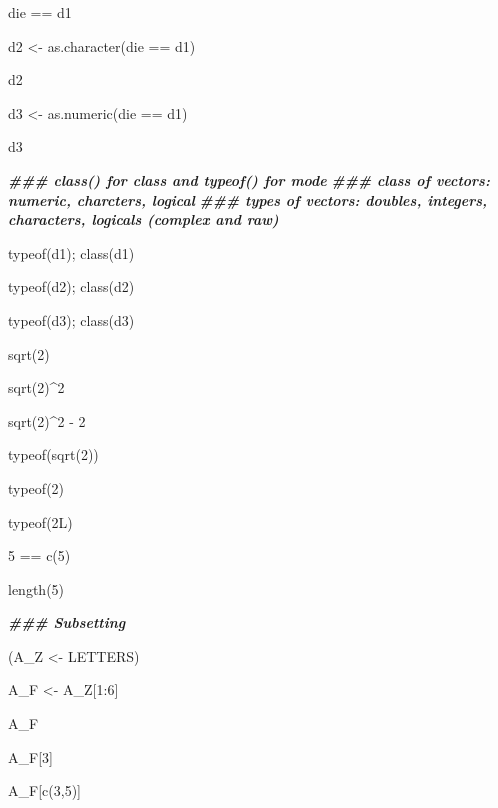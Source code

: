 \documentclass[
]{article}
\newenvironment{Shaded}{\begin{snugshade}}{\end{snugshade}}
\newcommand{\DecValTok}[1]{\textcolor[rgb]{0.00,0.00,0.81}{#1}}
\newcommand{\DocumentationTok}[1]{\textcolor[rgb]{0.56,0.35,0.01}{\textbf{\textit{#1}}}}
\newcommand{\FunctionTok}[1]{\textcolor[rgb]{0.00,0.00,0.00}{#1}}
\newcommand{\NormalTok}[1]{#1}
\newcommand{\OtherTok}[1]{\textcolor[rgb]{0.56,0.35,0.01}{#1}}
\newcommand{\SpecialCharTok}[1]{\textcolor[rgb]{0.00,0.00,0.00}{#1}}
\begin{document}
\begin{Shaded}
\begin{Highlighting}[]
\NormalTok{die }\SpecialCharTok{==}\NormalTok{ d1}

\NormalTok{d2 }\OtherTok{\textless{}{-}} \FunctionTok{as.character}\NormalTok{(die }\SpecialCharTok{==}\NormalTok{ d1)}

\NormalTok{d2}

\NormalTok{d3 }\OtherTok{\textless{}{-}} \FunctionTok{as.numeric}\NormalTok{(die }\SpecialCharTok{==}\NormalTok{ d1)}

\NormalTok{d3}

\DocumentationTok{\#\#\# class() for class and typeof() for mode}
\DocumentationTok{\#\#\# class of vectors: numeric, charcters, logical}
\DocumentationTok{\#\#\# types of vectors: doubles, integers, characters, logicals (complex and raw)}

\FunctionTok{typeof}\NormalTok{(d1); }\FunctionTok{class}\NormalTok{(d1)}

\FunctionTok{typeof}\NormalTok{(d2); }\FunctionTok{class}\NormalTok{(d2)}

\FunctionTok{typeof}\NormalTok{(d3); }\FunctionTok{class}\NormalTok{(d3)}

\FunctionTok{sqrt}\NormalTok{(}\DecValTok{2}\NormalTok{)}

\FunctionTok{sqrt}\NormalTok{(}\DecValTok{2}\NormalTok{)}\SpecialCharTok{\^{}}\DecValTok{2}

\FunctionTok{sqrt}\NormalTok{(}\DecValTok{2}\NormalTok{)}\SpecialCharTok{\^{}}\DecValTok{2} \SpecialCharTok{{-}} \DecValTok{2}

\FunctionTok{typeof}\NormalTok{(}\FunctionTok{sqrt}\NormalTok{(}\DecValTok{2}\NormalTok{))}

\FunctionTok{typeof}\NormalTok{(}\DecValTok{2}\NormalTok{)}

\FunctionTok{typeof}\NormalTok{(2L)}

\DecValTok{5} \SpecialCharTok{==} \FunctionTok{c}\NormalTok{(}\DecValTok{5}\NormalTok{)}

\FunctionTok{length}\NormalTok{(}\DecValTok{5}\NormalTok{)}

\DocumentationTok{\#\#\# Subsetting}

\NormalTok{(A\_Z }\OtherTok{\textless{}{-}}\NormalTok{ LETTERS)}

\NormalTok{A\_F }\OtherTok{\textless{}{-}}\NormalTok{ A\_Z[}\DecValTok{1}\SpecialCharTok{:}\DecValTok{6}\NormalTok{]}

\NormalTok{A\_F}

\NormalTok{A\_F[}\DecValTok{3}\NormalTok{]}

\NormalTok{A\_F[}\FunctionTok{c}\NormalTok{(}\DecValTok{3}\NormalTok{,}\DecValTok{5}\NormalTok{)]}


\end{Highlighting}
\end{Shaded}
\end{document}
